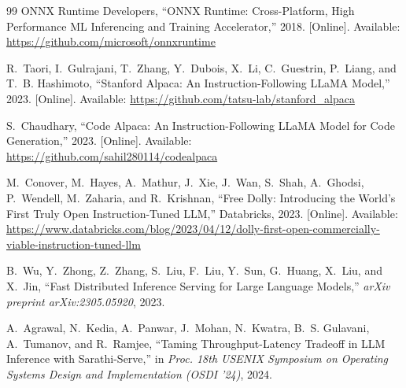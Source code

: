 \documentclass[10pt,letterpaper]{article}
\begin{document}
\begin{thebibliography}{99}
ONNX Runtime Developers,
``ONNX Runtime: Cross-Platform, High Performance ML Inferencing and Training Accelerator,''
2018. [Online]. Available: \url{https://github.com/microsoft/onnxruntime}

R.~Taori, I.~Gulrajani, T.~Zhang, Y.~Dubois, X.~Li, C.~Guestrin, P.~Liang, and T.~B. Hashimoto,
``Stanford Alpaca: An Instruction-Following LLaMA Model,''
2023. [Online]. Available: \url{https://github.com/tatsu-lab/stanford_alpaca}

S.~Chaudhary,
``Code Alpaca: An Instruction-Following LLaMA Model for Code Generation,''
2023. [Online]. Available: \url{https://github.com/sahil280114/codealpaca}

M.~Conover, M.~Hayes, A.~Mathur, J.~Xie, J.~Wan, S.~Shah, A.~Ghodsi, P.~Wendell, M.~Zaharia, and R.~Krishnan,
``Free Dolly: Introducing the World's First Truly Open Instruction-Tuned LLM,''
Databricks, 2023. [Online]. Available: \url{https://www.databricks.com/blog/2023/04/12/dolly-first-open-commercially-viable-instruction-tuned-llm}

B.~Wu, Y.~Zhong, Z.~Zhang, S.~Liu, F.~Liu, Y.~Sun, G.~Huang, X.~Liu, and X.~Jin,
``Fast Distributed Inference Serving for Large Language Models,''
\textit{arXiv preprint arXiv:2305.05920}, 2023.

A.~Agrawal, N.~Kedia, A.~Panwar, J.~Mohan, N.~Kwatra, B.~S. Gulavani, A.~Tumanov, and R.~Ramjee,
``Taming Throughput-Latency Tradeoff in LLM Inference with Sarathi-Serve,''
in \textit{Proc. 18th USENIX Symposium on Operating Systems Design and Implementation (OSDI '24)},
2024.

\end{thebibliography}
\end{document}

